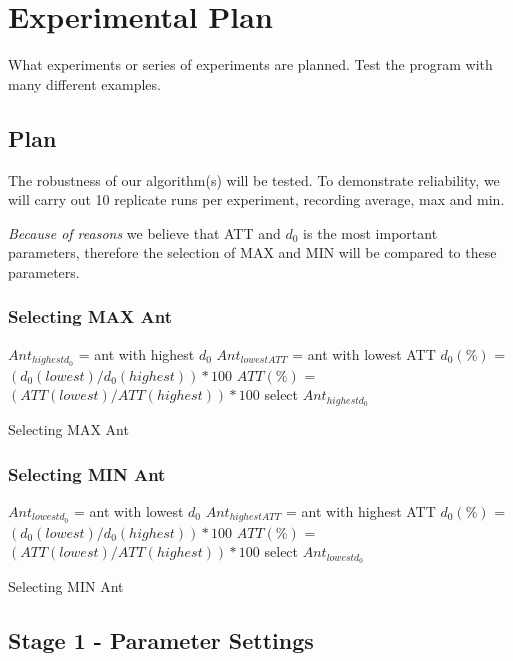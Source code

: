 \section{Experimental Plan}

What experiments or series of experiments are planned. Test the program with many different examples.


\subsection{Plan}
The robustness of our algorithm(s) will be tested. To demonstrate reliability, we will carry out 10 replicate runs per experiment, recording average, max and min.  

\emph{\color{red} Because of reasons }we believe that ATT and $d_0$ is the most important parameters, therefore the selection of MAX and MIN will be compared to these parameters.

\subsubsection{Selecting MAX Ant}

\begin{algorithm}[H]
$Ant_{highestd_0}$ = ant with highest $d_0$\;
$Ant_{lowestATT}$ = ant with lowest ATT\;
{
	$d_0(\%)$ = $(d_0(lowest) / d_0(highest))*100$\;
	$ATT(\%)$ = $(ATT(lowest) / ATT(highest))*100$\;
	{
		select $Ant_{highestd_0}$
	}
}
 \caption{Selecting MAX Ant}
\end{algorithm}

\subsubsection{Selecting MIN Ant}
\begin{algorithm}[H]
$Ant_{lowestd_0}$ = ant with lowest $d_0$\;
$Ant_{highestATT}$ = ant with highest ATT\;
{
	$d_0(\%)$ = $(d_0(lowest) / d_0(highest))*100$\;
	$ATT(\%)$ = $(ATT(lowest) / ATT(highest))*100$\;
	{
		select $Ant_{lowestd_0}$
	}
}
 \caption{Selecting MIN Ant}
\end{algorithm}


\subsection{Stage 1 - Parameter Settings}

